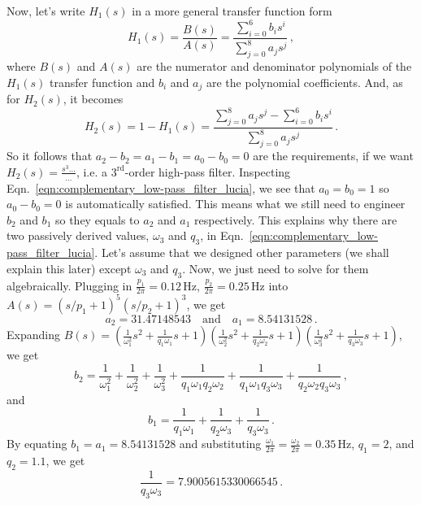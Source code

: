 Now, let's write $H_1(s)$ in a more general transfer function form
\begin{equation}
	H_1(s) = \frac{B(s)}{A(s)} = \frac{\sum_{i=0}^6 b_is^i}{\sum_{j=0}^8 a_js^j}\,,
	\label{eqn:complementary_low-pass_filter_lucia_polynomial}
\end{equation}
where $B(s)$ and $A(s)$ are the numerator and denominator polynomials of the $H_1(s)$ transfer function and $b_i$ and $a_j$ are the polynomial coefficients.
And, as for $H_2(s)$, it becomes
\begin{equation}
	H_2(s) = 1-H_1(s) = \frac{\sum_{j=0}^8 a_js^j - \sum_{i=0}^6 b_is^i}{\sum_{j=0}^8 a_j s^j}\,.
\end{equation}
So it follows that $a_2-b_2=a_1-b_1=a_0-b_0=0$ are the requirements, if we want $H_2(s) = \frac{s^3\dots}{\dots}$, i.e. a $3^\mathrm{rd}$-order high-pass filter.
Inspecting Eqn.~\eqref{eqn:complementary_low-pass_filter_lucia}, we see that $a_0=b_0=1$ so $a_0-b_0=0$ is automatically satisfied.
This means what we still need to engineer $b_2$ and $b_1$ so they equals to $a_2$ and $a_1$ respectively.
This explains why there are two passively derived values, $\omega_3$ and $q_3$, in Eqn.~\eqref{eqn:complementary_low-pass_filter_lucia}.
Let's assume that we designed other parameters (we shall explain this later) except $\omega_3$ and $q_3$.
Now, we just need to solve for them algebraically.
Plugging in $\frac{p_1}{2\pi} = 0.12\,\mathrm{Hz}$, $\frac{p_2}{2\pi} = 0.25\,\mathrm{Hz}$ into $A(s) = (s/p_1+1)^5(s/p_2+1)^3$, we get
\begin{equation}
	a_2=31.47148543 \quad\text{and}\quad a_1=8.54131528\,.
\end{equation}
Expanding $B(s)=\left(\frac{1}{\omega_1^2}s^2+\frac{1}{q_1\omega_1}s+1\right)\left(\frac{1}{\omega_2^2}s^2+\frac{1}{q_2\omega_2}s+1\right)\left(\frac{1}{\omega_3^2}s^2+\frac{1}{q_3\omega_3}s+1\right)$,
we get
\begin{equation}
	b_2 = \frac{1}{\omega_1^2} + \frac{1}{\omega_2^2} + \frac{1}{\omega_3^2} + \frac{1}{q_1\omega_1 q_2\omega_2} + \frac{1}{q_1\omega_1 q_3\omega_3} + \frac{1}{q_2\omega_2 q_3\omega_3}\,,
	\label{eqn:b_2_unsolved}
\end{equation}
and
\begin{equation}
	b_1 = \frac{1}{q_1\omega_1}+\frac{1}{q_2\omega_3}+\frac{1}{q_3\omega_3}\,.
\end{equation}
By equating $b_1=a_1=8.54131528$ and substituting $\frac{\omega_1}{2\pi}=\frac{\omega_2}{2\pi} = 0.35\,\mathrm{Hz}$, $q_1 = 2$, and $q_2 = 1.1$, we get
\begin{equation}
	\frac{1}{q_3\omega_3} = 7.9005615330066545\,.
	\label{eqn:1_over_q3_omega3}
\end{equation}
